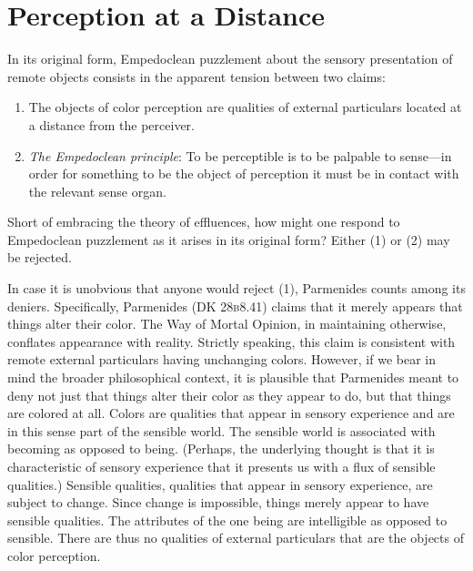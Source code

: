 \chapter{Perception at a Distance} %
\label{cha:perception_at_a_distance}

In its original form, Empedoclean puzzlement about the sensory presentation of remote objects consists in the apparent tension between two claims:
\begin{enumerate}[(1)]
    \item The objects of color perception are qualities of external particulars located at a distance from the perceiver.
    \item \emph{The Empedoclean principle}: To be perceptible is to be palpable to sense---in order for something to be the object of perception it must be in contact with the relevant sense organ.
\end{enumerate}
Short of embracing the theory of effluences, how might one respond to Empedoclean puzzlement as it arises in its original form? Either (1) or (2) may be rejected. 

In case it is unobvious that anyone would reject (1), Parmenides counts among its deniers. Specifically, Parmenides (DK 28\textsc{b}8.41) claims that it merely appears that things alter their color. The Way of Mortal Opinion, in maintaining otherwise, conflates appearance with reality. Strictly speaking, this claim is consistent with remote external particulars having unchanging colors. However, if we bear in mind the broader philosophical context, it is plausible that Parmenides meant to deny not just that things alter their color as they appear to do, but that things are colored at all. Colors are qualities that appear in sensory experience and are in this sense part of the sensible world. The sensible world is associated with becoming as opposed to being. (Perhaps, the underlying thought is that it is characteristic of sensory experience that it presents us with a flux of sensible qualities.) Sensible qualities, qualities that appear in sensory experience, are subject to change. Since change is impossible, things merely appear to have sensible qualities. The attributes of the one being are intelligible as opposed to sensible. There are thus no qualities of external particulars that are the objects of color perception. 

